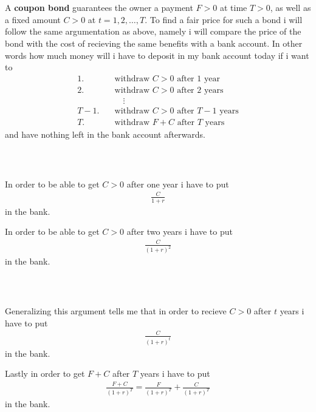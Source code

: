 \documentclass{beamer}
\numberwithin{equation}{section}
\begin{document}
\begin{frame}\frametitle{{\normalsize \secname} \\ {\large \subsecname}}
    A \textbf{coupon bond} guarantees the owner a payment $F > 0$ at time $T > 0$, as well as a fixed amount $C > 0$ at $t = 1,2,\ldots,T$.
    To find a fair price for such a bond i will follow the same argumentation as above, namely i will compare the price of the bond with the cost of recieving the same benefits with a bank account.
    In other words how much money will i have to deposit in my bank account today if i want to
    \begin{align}
        \text{1.} \quad &\text{withdraw $C > 0$ after 1 year} \\
        \text{2.} \quad &\text{withdraw $C > 0$ after 2 years} \\
        &\quad \vdots \nonumber \\
        \text{$T-1$.} \quad &\text{withdraw $C > 0$ after $T-1$ years} \\
        \text{$T$.} \quad &\text{withdraw $F + C$ after $T$ years}
    \end{align}
    and have nothing left in the bank account afterwards.
\end{frame}

\begin{frame}\frametitle{{\normalsize \secname} \\ {\large \subsecname}}
    In order to be able to get $C > 0$ after one year i have to put
    \begin{align}
        \frac{C}{1+r}
    \end{align}
    in the bank.
    \pause

    In order to be able to get $C > 0$ after two years i have to put 
    \begin{align}
        \frac{C}{(1+r)^2}
    \end{align}
    in the bank.
\end{frame}

\begin{frame}\frametitle{{\normalsize \secname} \\ {\large \subsecname}}
    Generalizing this argument tells me that in order to recieve $C > 0$ after $t$ years i have to put
    \begin{align}
        \frac{C}{(1+r)^t}
    \end{align}
    in the bank.
    \pause

    Lastly in order to get $F + C$ after $T$ years i have to put
    \begin{align}
        \frac{F + C}{(1+r)^T} = \frac{F}{(1+r)^T} + \frac{C}{(1+r)^T}
    \end{align}
    in the bank.
\end{frame}
\end{document}
